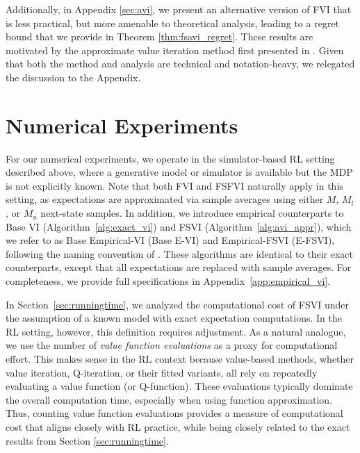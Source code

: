 \documentclass[11pt, notitlepage]{article}
\newcommand{\1}{\mathbbm{1}}
\begin{document}
Additionally, in Appendix \ref{sec:avi}, we present an alternative version of FVI that is less practical, but more amenable to theoretical analysis, leading to a regret bound that we provide in Theorem \ref{thm:fsavi_regret}. These results are motivated by the approximate value iteration method first presented in \cite{tsitsiklis1996feature}. Given that both the method and analysis are technical and notation-heavy, we relegated the discussion to the Appendix.


\section{Numerical Experiments}
\label{sec:experiment}
For our numerical experiments, we operate in the simulator-based RL setting described above, where a generative model or simulator is available but the MDP is not explicitly known. Note that both FVI and FSFVI naturally apply in this setting, as expectations are approximated via sample averages using either $M$, $M_l$, or $M_u$ next-state samples. In addition, we introduce empirical counterparts to Base VI (Algorithm~\ref{alg:exact_vi}) and FSVI (Algorithm~\ref{alg:avi_appr}), which we refer to as Base Empirical-VI (Base E-VI) and Empirical-FSVI (E-FSVI), following the naming convention of \citet{haskell2016empirical}. These algorithms are identical to their exact counterparts, except that all expectations are replaced with sample averages. For completeness, we provide full specifications in Appendix~\ref{app:empirical_vi}.

In Section~\ref{sec:runningtime}, we analyzed the computational cost of FSVI under the assumption of a known model with exact expectation computations. In the RL setting, however, this definition requires adjustment. As a natural analogue, we use the number of \emph{value function evaluations} as a proxy for computational effort. This makes sense in the RL context because value-based methods, whether value iteration, Q-iteration, or their fitted variants, all rely on repeatedly evaluating a value function (or Q-function). These evaluations typically dominate the overall computation time, especially when using function approximation. Thus, counting value function evaluations provides a measure of computational cost that aligns closely with RL practice, while being closely related to the exact results from Section \ref{sec:runningtime}.
\end{document}
